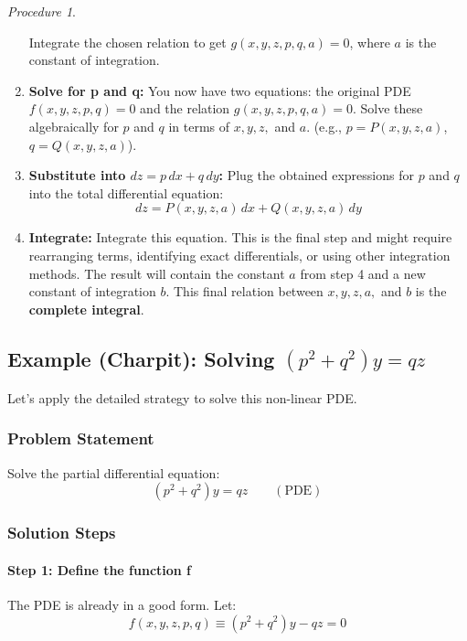 \documentclass{article}
\theoremstyle{remark}
\newtheorem{procedure}{Procedure}[subsection] %
\begin{document}
\begin{procedure}
\begin{enumerate}
\begin{itemize}
			\end{itemize}
			Integrate the chosen relation to get $g(x, y, z, p, q, a) = 0$, where $a$ is the constant of integration.
			\item \textbf{Solve for p and q:} You now have two equations: the original PDE $f(x, y, z, p, q) = 0$ and the relation $g(x, y, z, p, q, a) = 0$. Solve these algebraically for $p$ and $q$ in terms of $x, y, z,$ and $a$. (e.g., $p = P(x,y,z,a)$, $q = Q(x,y,z,a)$).
			\item \textbf{Substitute into $dz = p \, dx + q \, dy$:} Plug the obtained expressions for $p$ and $q$ into the total differential equation:
			\[ dz = P(x,y,z,a) \, dx + Q(x,y,z,a) \, dy \]
			\item \textbf{Integrate:} Integrate this equation. This is the final step and might require rearranging terms, identifying exact differentials, or using other integration methods. The result will contain the constant $a$ from step 4 and a new constant of integration $b$. This final relation between $x, y, z, a,$ and $b$ is the \textbf{complete integral}.
		\end{enumerate}
	\end{procedure}
	
	\subsection{Example (Charpit): Solving $(p^2 + q^2)y = qz$}
	Let's apply the detailed strategy to solve this non-linear PDE.
	
	\subsubsection{Problem Statement}
	Solve the partial differential equation:
	\begin{equation}
		(p^2 + q^2)y = qz \quad \quad (\text{PDE})
	\end{equation}
	
	\subsubsection{Solution Steps}
	
	\paragraph{Step 1: Define the function f}
	The PDE is already in a good form. Let:
	\begin{equation} \label{eq:f_def_ex_charpit_example}
		f(x, y, z, p, q) \equiv (p^2 + q^2)y - qz = 0
	\end{equation}
	
\end{document}
